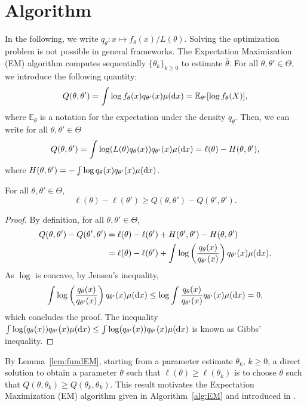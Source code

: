 \documentclass[english,graybox,envcountchap,envcountsame,sectrefs,shortlabels]{svmono}
\theoremstyle{style}
\newcommand{\eqsp}{}
\begin{document}
\section{Algorithm}
In the following, we write $q_\theta:x\mapsto f_\theta(x)/L(\theta)$. Solving the optimization problem is not possible in general frameworks. The Expectation Maximization (EM) algorithm computes sequentially $\{\theta_k\}_{k\geq 0}$ to estimate $\widehat \theta$. For all $\theta,\theta'\in\Theta$, we introduce the following quantity:
$$
Q(\theta,\theta') = \int \log f_\theta(x)q_{\theta'}(x)\mu(\rmd x) = \mathbb{E}_{\theta'}[\log f_\theta(X)]\eqsp,
$$
where $\mathbb{E}_{\theta}$ is a notation for the expectation under the density $q_\theta$. Then, we can write for all $\theta,\theta'\in\Theta$
$$
Q(\theta,\theta') = \int \log (L(\theta)q_\theta(x))q_{\theta'}(x)\mu(\rmd x) = \ell(\theta) - H(\theta,\theta')\eqsp,
$$
where $H(\theta,\theta') = - \int \log q_\theta(x) q_{\theta'}(x)\mu(\mathrm{d} x)$.

\begin{lemma}
\label{lem:fundEM}
For all $\theta,\theta'\in\Theta$,
$$
\ell(\theta)-\ell(\theta')\geq Q(\theta,\theta')-Q(\theta',\theta')\eqsp.
$$
\end{lemma}
\begin{proof}
By definition, for all $\theta,\theta'\in\Theta$,
\begin{align*}
Q(\theta,\theta')-Q(\theta',\theta') &= \ell(\theta)-\ell(\theta') + H(\theta',\theta') - H(\theta,\theta')\\
&= \ell(\theta)-\ell(\theta') + \int \log\left(\frac{q_\theta(x)}{q_{\theta'}(x)}\right)q_{\theta'}(x)\mu(\rmd x)\eqsp.
\end{align*}
As $\log$ is concave, by Jensen's inequality, 
$$
\int \log\left(\frac{q_\theta(x)}{q_{\theta'}(x)}\right)q_{\theta'}(x)\mu(\rmd x) \leq \log\int \frac{q_\theta(x)}{q_{\theta'}(x)}q_{\theta'}(x)\mu(\rmd x) = 0\eqsp,
$$
which concludes the proof. The inequality $\int \log(q_\theta(x))q_{\theta'}(x)\mu(\mathrm{d} x) \leq \int \log(q_{\theta'}(x))q_{\theta'}(x)\mu(\mathrm{d} x)$ is known as Gibbs' inequality.
\end{proof}
By Lemma~\ref{lem:fundEM}, starting from a parameter estimate $\theta_k$, $k\geq 0$, a direct solution to obtain a parameter $\theta$ such that $\ell(\theta) \geq \ell(\theta_k)$ is to choose $\theta$ such that $Q(\theta,\theta_k)\geq Q(\theta_k,\theta_k)$. This result motivates the Expectation Maximization (EM) algorithm given in Algorithm~\ref{alg:EM} and introduced in \cite{dempster1977maximum}.
\end{document}
